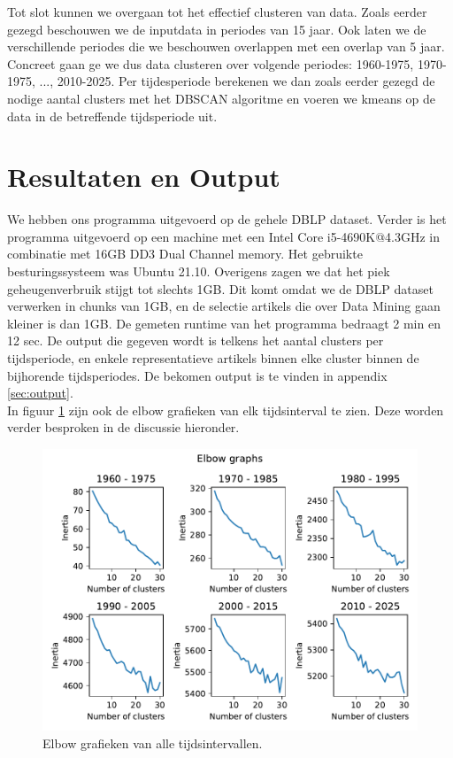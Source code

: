 \documentclass[a4paper,fontsize=11pt]{article}
\begin{document}

Tot slot kunnen we overgaan tot het effectief clusteren van data. Zoals eerder gezegd beschouwen we de inputdata in periodes van 15 jaar. Ook laten we de verschillende periodes die we beschouwen overlappen met een overlap van 5 jaar. Concreet gaan ge we dus data clusteren over volgende periodes: 1960-1975, 1970-1975, ..., 2010-2025. Per tijdesperiode berekenen we dan zoals eerder gezegd de nodige aantal clusters met het DBSCAN algoritme en voeren we kmeans op de data in de betreffende tijdsperiode uit. 

\section{Resultaten en Output}

We hebben ons programma uitgevoerd op de gehele DBLP dataset. Verder is het programma uitgevoerd op een machine met een Intel Core i5-4690K@4.3GHz in combinatie met 16GB DD3 Dual Channel memory. Het gebruikte besturingssysteem was Ubuntu 21.10. Overigens zagen we dat het piek geheugenverbruik stijgt tot slechts 1GB. Dit komt omdat we de DBLP dataset verwerken in chunks van 1GB, en de selectie artikels die over Data Mining gaan kleiner is dan 1GB. De gemeten runtime van het programma bedraagt 2 min en 12 sec. De output die gegeven wordt is telkens het aantal clusters per tijdsperiode, en enkele representatieve artikels binnen elke cluster binnen de bijhorende tijdsperiodes. De bekomen output is te vinden in appendix \ref{sec:output}. \\

In figuur \ref{fig:elbow} zijn ook de elbow grafieken van elk tijdsinterval te zien. Deze worden verder besproken in de discussie hieronder.

\begin{figure}[H]
  \centering
  \includegraphics[width=\textwidth]{elbow.pdf}
  \caption{Elbow grafieken van alle tijdsintervallen.}
  \label{fig:elbow}
\end{figure}
\end{document}
